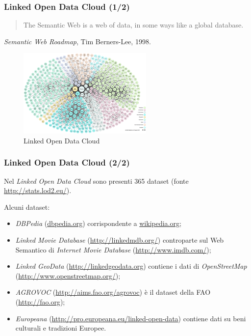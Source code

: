 \documentclass[8pt]{beamer}
\begin{document}
\begin{frame}
\frametitle{Linked Open Data Cloud (1/2)}
\begin{quote}
The Semantic Web is a web of data, in some ways like a global database.
\end{quote}
\small{\emph{Semantic Web Roadmap}, Tim Berners-Lee, 1998.}
\begin{figure}
    \includegraphics[width=250px]{lod-cloud_colored_1000px.png} 
    \caption{Linked Open Data Cloud}
\end{figure}
\end{frame}

\begin{frame}
\frametitle{Linked Open Data Cloud (2/2)}
Nel \emph{Linked Open Data Cloud} sono presenti 365 dataset (fonte \url{http://stats.lod2.eu/}).
\vspace{\baselineskip}

Alcuni dataset:
\begin{itemize}
 \item \emph{DBPedia} (\url{dbpedia.org}) corrispondente a \url{wikipedia.org};
 \item \emph{Linked Movie Database} (\url{http://linkedmdb.org/}) controparte sul Web Semantico di \emph{Internet Movie Database} 
 (\url{http://www.imdb.com/});
 \item \emph{Linked GeoData} (\url{http://linkedgeodata.org}) 
  contiene i dati di \emph{OpenStreetMap} (\url{http://www.openstreetmap.org/});
  \item \emph{AGROVOC} (\url{http://aims.fao.org/agrovoc}) \`e il dataset della FAO (\url{http://fao.org});
  \item \emph{Europeana} (\url{http://pro.europeana.eu/linked-open-data}) contiene dati su beni culturali e tradizioni Europee. 
\end{itemize}
\end{frame}
\end{document}
